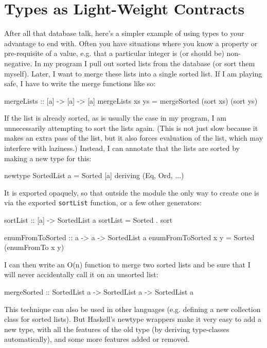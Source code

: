 \documentclass{tmr}
\begin{document}
\section{Types as Light-Weight Contracts}

After all that database talk, here's a simpler example of using types to your advantage to end with.  Often you have situations where you know a property or pre-requisite of a value, e.g. that a particular integer is (or should be) non-negative.  In my program I pull out sorted lists from the database (or sort them myself).  Later, I want to merge these lists into a single sorted list.  If I am playing safe, I have to write the merge functions like so:

\begin{code}
mergeLists :: [a] -> [a] -> [a]
mergeLists xs ys = mergeSorted (sort xs) (sort ys)
\end{code}

If the list is already sorted, as is usually the case in my program, I am unnecessarily attempting to sort the lists again.  (This is not just slow because it makes an extra pass of the list, but it also forces evaluation of the list, which may interfere with laziness.)  Instead, I can annotate that the lists are sorted by making a new type for this:

\begin{code}
newtype SortedList a = Sorted [a] deriving (Eq, Ord, ...)
\end{code}

It is exported opaquely, so that outside the module the only way to create one is via the exported \lstinline|sortList| function, or a few other generators:

\begin{code}
sortList :: [a] -> SortedList a
sortList = Sorted . sort

enumFromToSorted :: a -> a -> SortedList a
enumFromToSorted x y = Sorted (enumFromTo x y)
\end{code}

I can then write an O(n) function to merge two sorted lists and be sure that I will never accidentally call it on an unsorted list:

\begin{code}
mergeSorted :: SortedList a -> SortedList a -> SortedList a
\end{code}

This technique can also be used in other languages (e.g. defining a new collection class for sorted lists).  But Haskell's newtype wrappers make it very easy to add a new type, with all the features of the old type (by deriving type-classes automatically), and some more features added or removed.
\end{document}
